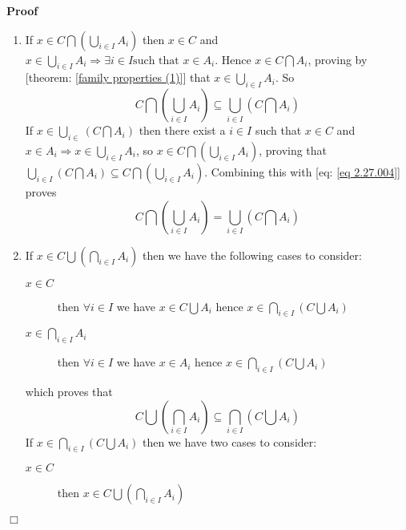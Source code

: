 \documentclass{book}
\newenvironment{proof}{\noindent\textbf{Proof\ }}{\hspace*{\fill}$\Box$\medskip}
\begin{document}
\begin{proof}
  
  \begin{enumerate}
    \item If $x \in C \bigcap \left( \bigcup_{i \in I} A_i \right)$ then $x
    \in C$ and $x \in \bigcup_{i \in I} A_i \Rightarrow \exists i \in I \text{
    such that } x \in A_i$. Hence $x \in C \bigcap A_i$, proving by [theorem:
    \ref{family properties (1)}] that $x \in \bigcup_{i \in I} A_i$. So
    \begin{equation}
      \label{eq 2.27.004} C \bigcap \left( \bigcup_{i \in I} A_i \right)
      \subseteq \bigcup_{i \in I} \left( C \bigcap A_i \right)
    \end{equation}
    If $x \in \bigcup_{i \in} \left( C \bigcap A_i \right)$ then there exist a
    $i \in I$ such that $x \in C$ and $x \in A_i \Rightarrow x \in \bigcup_{i
    \in I} A_i$, so $x \in C \bigcap \left( \bigcup_{i \in I} A_i \right)$,
    proving that $\bigcup_{i \in I} \left( C \bigcap A_i \right) \subseteq C
    \bigcap \left( \bigcup_{i \in I} A_i \right)$. Combining this with [eq:
    \ref{eq 2.27.004}] proves
    \[ C \bigcap \left( \bigcup_{i \in I} A_i \right) = \bigcup_{i \in I}
       \left( C \bigcap A_i \right) \]
    \item If $x \in C \bigcup \left( \bigcap_{i \in I} A_i \right)$ then we
    have the following cases to consider:
    \begin{description}
      \item[$x \in C$] then $\forall i \in I$ we have $x \in C \bigcup A_i$
      hence $x \in \bigcap_{i \in I} \left( C \bigcup A_i \right)$
      
      \item[$x \in \bigcap_{i \in I} A_i$] then $\forall i \in I$ we have $x
      \in A_i$ hence $x \in \bigcap_{i \in I} \left( C \bigcup A_i \right)$
    \end{description}
    which proves that
    \begin{equation}
      \label{eq 2.28.004} C \bigcup \left( \bigcap_{i \in I} A_i \right)
      \subseteq \bigcap_{i \in I} \left( C \bigcup A_i \right)
    \end{equation}
    If $x \in \bigcap_{i \in I} \left( C \bigcup A_i \right)$ then we have two
    cases to consider:
    \begin{description}
      \item[$x \in C$] then $x \in C \bigcup \left( \bigcap_{i \in I} A_i
      \right)$
      

\end{description}
\end{enumerate}
\end{proof}
\end{document}
